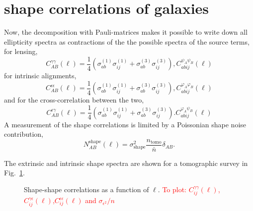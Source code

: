 \documentclass[a4paper,fleqn,usenatbib]{mnras}
\newcommand\BG[1]{\textcolor{red}{#1}}
\begin{document}
\section{shape correlations of galaxies}\label{sect_shapes}
Now, the decomposition with Pauli-matrices makes it possible to write down all ellipticity spectra as contractions of the the possible spectra of the source terms, for lensing,
\begin{equation}
C^{\gamma\gamma}_{AB}(\ell) = \frac{1}{4}
\left(\sigma^{(1)}_{ab}\sigma^{(1)}_{ij} + \sigma^{(3)}_{ab}\sigma^{(3)}_{ij}\right),
C^{\psi_A\psi_B}_{abij}(\ell)
\end{equation}
for intrinsic alignments,
\begin{equation}
C^{\epsilon\epsilon}_{AB}(\ell) = \frac{1}{4}
\left(\sigma^{(1)}_{ab}\sigma^{(1)}_{ij} + \sigma^{(3)}_{ab}\sigma^{(3)}_{ij}\right),
C^{\varphi_A\varphi_B}_{abij}(\ell)
\end{equation}
and for the cross-correlation between the two,
\begin{equation}
C^{\epsilon\gamma}_{AB}(\ell) = \frac{1}{4}
\left(\sigma^{(1)}_{ab}\sigma^{(1)}_{ij} + \sigma^{(3)}_{ab}\sigma^{(3)}_{ij}\right).
C^{\varphi_A\psi_B}_{abij}(\ell)
\end{equation}
A measurement of the shape correlations is limited by a Poissonian shape noise contribution,
\begin{equation}
N_{AB}^\mathrm{shape}(\ell) = \sigma^2_\mathrm{shape}\frac{n_\mathrm{tomo}}{\bar{n}}\delta_{AB}.
\end{equation}


The extrinsic and intrinsic shape spectra are shown for a tomographic survey in Fig.~\ref{fig:shapeshape}.

\begin{figure}
\centering
\caption{Shape-shape correlations as a function of $\ell$. \BG{To plot: $C_{ij}^{\gamma\gamma}(\ell)$,$C_{ij}^{\gamma\epsilon}(\ell)$,$C_{ij}^{\epsilon\epsilon}(\ell)$ and $\sigma_{\epsilon^2}/n$}}
\label{fig:shapeshape}
\end{figure}


\end{document}
